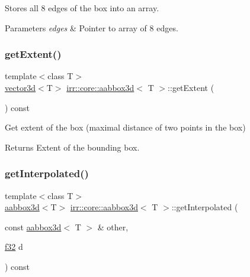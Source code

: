 Stores all 8 edges of the box into an array. 


\begin{DoxyParams}{Parameters}
{\em edges} & Pointer to array of 8 edges. \\
\hline
\end{DoxyParams}
\mbox{\label{classirr_1_1core_1_1aabbox3d_a6a1e82ae4fdb3cf9fac19905b772e03e}} 
\subsubsection{\texorpdfstring{get\+Extent()}{getExtent()}}
{\footnotesize\ttfamily template$<$class T$>$ \\
\hyperlink{classirr_1_1core_1_1vector3d}{vector3d}$<$T$>$ \hyperlink{classirr_1_1core_1_1aabbox3d}{irr\+::core\+::aabbox3d}$<$ T $>$\+::get\+Extent (\begin{DoxyParamCaption}{ }\end{DoxyParamCaption}) const\hspace{0.3cm}{\ttfamily [inline]}}



Get extent of the box (maximal distance of two points in the box) 

\begin{DoxyReturn}{Returns}
Extent of the bounding box. 
\end{DoxyReturn}
\mbox{\label{classirr_1_1core_1_1aabbox3d_a2c2073f3693819d99906f2ae36dd19de}} 
\subsubsection{\texorpdfstring{get\+Interpolated()}{getInterpolated()}}
{\footnotesize\ttfamily template$<$class T$>$ \\
\hyperlink{classirr_1_1core_1_1aabbox3d}{aabbox3d}$<$T$>$ \hyperlink{classirr_1_1core_1_1aabbox3d}{irr\+::core\+::aabbox3d}$<$ T $>$\+::get\+Interpolated (\begin{DoxyParamCaption}\item[{const \hyperlink{classirr_1_1core_1_1aabbox3d}{aabbox3d}$<$ T $>$ \&}]{other,  }\item[{\hyperlink{namespaceirr_a0277be98d67dc26ff93b1a6a1d086b07}{f32}}]{d }\end{DoxyParamCaption}) const\hspace{0.3cm}{\ttfamily [inline]}}




